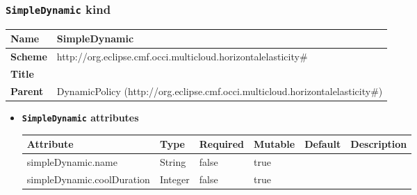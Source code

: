 \subsubsection{\texttt{SimpleDynamic} kind}
\begin{center}
\begin{tabular}{|l|l|}
  \hline
  \textbf{Name} & SimpleDynamic \\
  \hline  
  \textbf{Scheme} & http://org.eclipse.cmf.occi.multicloud.horizontalelasticity\# \\
  \hline
  \textbf{Title} &  \\
  \hline
  \textbf{Parent} & DynamicPolicy (http://org.eclipse.cmf.occi.multicloud.horizontalelasticity\#) \\
  \hline
\end{tabular}
\end{center}
\begin{itemize}
\item \textbf{\texttt{SimpleDynamic} attributes}

\begin{tabularx}{\textwidth}{|l|l|p{1.4cm}|p{1.3cm}|l|X|}
  \hline
  \textbf{Attribute} & \textbf{Type} & \textbf{Required} & \textbf{Mutable} & \textbf{Default} & \textbf{Description} \\
  \hline  
  simpleDynamic.name & String & false & true &  &  \\
  \hline
  simpleDynamic.coolDuration & Integer & false & true &  &  \\
  \hline
\end{tabularx}
\end{itemize}



